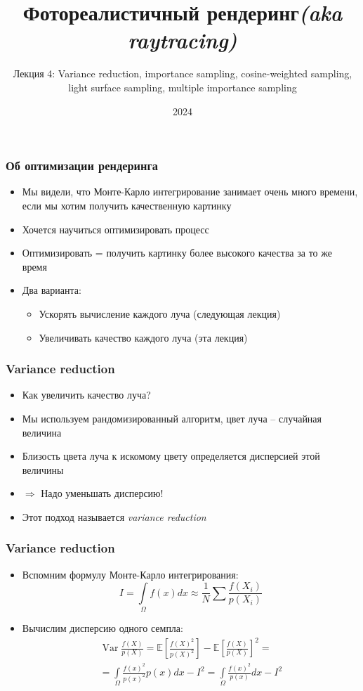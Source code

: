 \documentclass[10pt]{beamer}
\title{Фотореалистичный рендеринг\quad\quad\quad\quad\quad\quad \textit{(aka raytracing)}}
\subtitle{Лекция 4: Variance reduction, importance sampling, cosine-weighted sampling, light surface sampling, multiple importance sampling}
\date{2024}
\begin{document}
\frame{\titlepage}

\begin{frame}
\frametitle{Об оптимизации рендеринга}
\begin{itemize}
\item Мы видели, что Монте-Карло интегрирование занимает очень много времени, если мы хотим получить качественную картинку
\pause
\item Хочется научиться оптимизировать процесс
\pause
\item Оптимизировать = получить картинку более высокого качества за то же время
\pause
\item Два варианта:
\pause
\begin{itemize}
\item Ускорять вычисление каждого луча (следующая лекция)
\pause
\item Увеличивать качество каждого луча (эта лекция)
\end{itemize}
\end{itemize}
\end{frame}

\begin{frame}
\frametitle{Variance reduction}
\begin{itemize}
\item Как увеличить качество луча?
\pause
\item Мы используем рандомизированный алгоритм, цвет луча -- случайная величина
\pause
\item Близость цвета луча к искомому цвету определяется дисперсией этой величины
\pause
\item \begin{math}\Longrightarrow\end{math} Надо уменьшать дисперсию!
\pause
\item Этот подход называется \textit{variance reduction}
\end{itemize}
\end{frame}

\begin{frame}
\frametitle{Variance reduction}
\begin{itemize}
\item Вспомним формулу Монте-Карло интегрирования:
\begin{equation*}
I = \int\limits_\Omega f(x)dx \approx \frac{1}{N} \sum \frac{f(X_i)}{p(X_i)}
\end{equation*}
\pause
\item Вычислим дисперсию одного семпла:
\begin{gather*}
\operatorname{Var}\frac{f(X)}{p(X)} = \mathbb{E}\left[\frac{f(X)^2}{p(X)^2}\right] - \mathbb{E}\left[\frac{f(X)}{p(X)}\right]^2 = \\
= \int\limits_\Omega \frac{f(x)^2}{p(x)^2}p(x)dx - I^2 = \int\limits_\Omega \frac{f(x)^2}{p(x)}dx - I^2
\end{gather*}
\end{itemize}
\end{frame}
\end{document}
